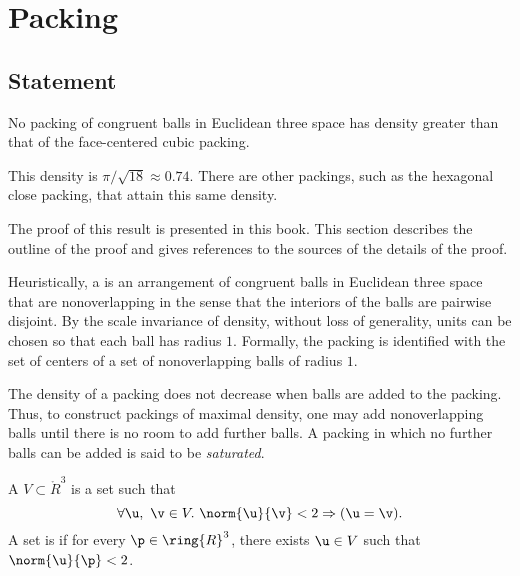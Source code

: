 
\chapter{Packing}


\section{Statement}



\begin{theorem}
\label{theorem:kepler}   No packing of congruent balls in
Euclidean three space has density greater than that of the
face-centered cubic packing.
\end{theorem}

\begin{remark}
This density is $\pi/\sqrt{18}\approx 0.74.$  There are other
packings, such as the hexagonal close packing, that attain this
same density.
\end{remark}

The proof of this result is presented in this book. This section
describes the outline of the proof and gives references to
the sources of the details of the proof.

Heuristically, a  is an arrangement of congruent
balls in Euclidean three space that are nonoverlapping in the sense
that the interiors of the balls are pairwise disjoint.  By the scale
invariance of density, without loss of generality, units can be chosen
so that each ball has radius $1$.  Formally, the packing is identified
with the set of centers of a set of nonoverlapping balls of radius
$1$.

The density of a packing does not decrease when balls are added to the
packing. Thus, to construct packings of maximal density, one may add
nonoverlapping balls until there is no room to add further balls.  A
packing in which no further balls can be added is said to be {\it
saturated}.

\begin{definition}
A  $ V\subset \ring{R}^3$ is a set such that
\begin{displaymath}\forall  \u,~\v\in  V.~  \norm{ \u}{\v} < 2 \Rightarrow ( \u=\v).\end{displaymath}
A set is  if for every $\p\in\ring{R}^3$, there
exists $ \u\in V$ such that $\norm{ \u}{\p}< 2$.
\end{definition}
%
%


